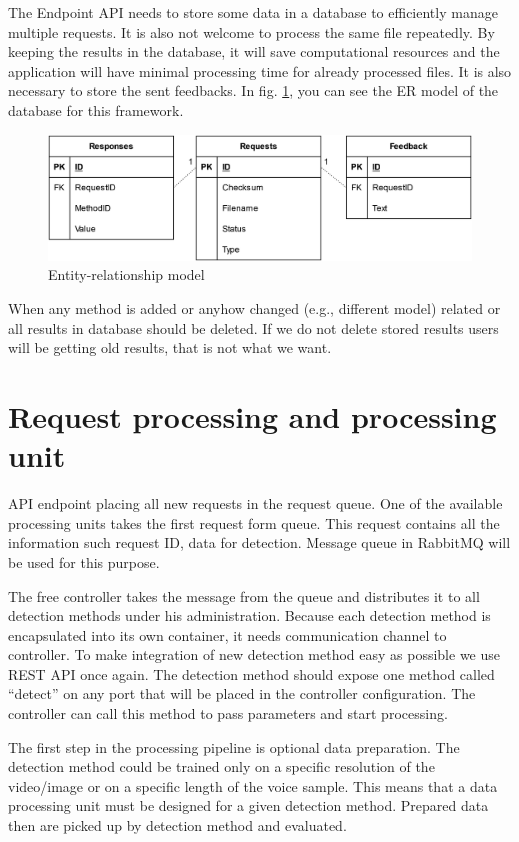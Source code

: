 The Endpoint API needs to store some data in a database to efficiently manage multiple requests. It is also not welcome to process the same file repeatedly. By keeping the results in the database, it will save computational resources and the application will have minimal processing time for already processed files. It is also necessary to store the sent feedbacks. In fig. \ref{fig:framework_architecture_database}, you can see the ER model of the database for this framework.

\begin{figure}[H]
    \centering
    \includegraphics[width=.725\linewidth]{other-fig/framework_architecture_database.png}
    \caption{Entity-relationship model}
\label{fig:framework_architecture_database}
\end{figure}

When any method is added or anyhow changed (e.g., different model) related or all results in database should be deleted. If we do not delete stored results users will be getting old results, that is not what we want.

\section{Request processing and processing unit}

API endpoint placing all new requests in the request queue. One of the available processing units takes the first request form queue. This request contains all the information such request ID, data for detection. Message queue in RabbitMQ will be used for this purpose.

The free controller takes the message from the queue and distributes it to all detection methods under his administration. Because each detection method is encapsulated into its own container, it needs communication channel to controller. To make integration of new detection method easy as possible we use REST API once again. The detection method should expose one method called “detect” on any port that will be placed in the controller configuration. The controller can call this method to pass parameters and start processing.

The first step in the processing pipeline is optional data preparation. The detection method could be trained only on a specific resolution of the video/image or on a specific length of the voice sample. This means that a data processing unit must be designed for a given detection method. Prepared data then are picked up by detection method and evaluated.

